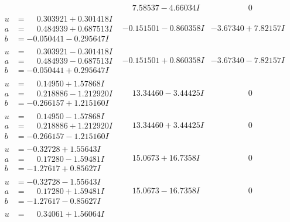 \documentclass[1p]{elsarticle_modified}
\theoremstyle{definition}
\begin{document}
$$\begin{array}{c|c|c}
 & \phantom{-}7.58537 - 4.66034 I & \phantom{-0.000000 } 0 \\ \hline\begin{aligned}
u &= \phantom{-}0.303921 + 0.301418 I \\
a &= \phantom{-}0.484939 + 0.687513 I \\
b &= -0.050441 - 0.295647 I\end{aligned}
 & -0.151501 - 0.860358 I & -3.67340 + 7.82157 I \\ \hline\begin{aligned}
u &= \phantom{-}0.303921 - 0.301418 I \\
a &= \phantom{-}0.484939 - 0.687513 I \\
b &= -0.050441 + 0.295647 I\end{aligned}
 & -0.151501 + 0.860358 I & -3.67340 - 7.82157 I \\ \hline\begin{aligned}
u &= \phantom{-}0.14950 + 1.57868 I \\
a &= \phantom{-}0.218886 - 1.212920 I \\
b &= -0.266157 + 1.215160 I\end{aligned}
 & \phantom{-}13.34460 - 3.44425 I & \phantom{-0.000000 } 0 \\ \hline\begin{aligned}
u &= \phantom{-}0.14950 - 1.57868 I \\
a &= \phantom{-}0.218886 + 1.212920 I \\
b &= -0.266157 - 1.215160 I\end{aligned}
 & \phantom{-}13.34460 + 3.44425 I & \phantom{-0.000000 } 0 \\ \hline\begin{aligned}
u &= -0.32728 + 1.55643 I \\
a &= \phantom{-}0.17280 - 1.59481 I \\
b &= -1.27617 + 0.85627 I\end{aligned}
 & \phantom{-}15.0673 + 16.7358 I & \phantom{-0.000000 } 0 \\ \hline\begin{aligned}
u &= -0.32728 - 1.55643 I \\
a &= \phantom{-}0.17280 + 1.59481 I \\
b &= -1.27617 - 0.85627 I\end{aligned}
 & \phantom{-}15.0673 - 16.7358 I & \phantom{-0.000000 } 0 \\ \hline\begin{aligned}
u &= \phantom{-}0.34061 + 1.56064 I \\

\end{aligned}
\end{array}$$
\end{document}
